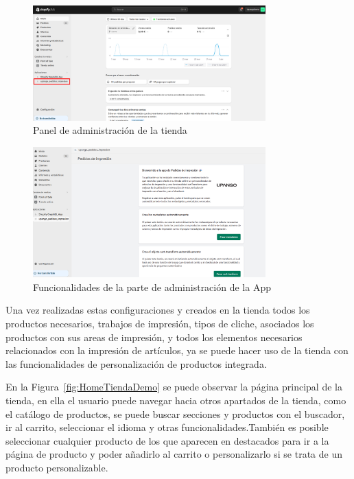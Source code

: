 \documentclass[11pt]{article}
\begin{document}
\begin{figure}[H]
    \centering
    \includegraphics[width=0.8\textwidth]{imagenes/ManualUsuario/PaginaAdministracion.png}
    \caption{\label{fig:PanelAdministracion}Panel de administración de la tienda}
    \vspace{\fill}
\end{figure}

\begin{figure}[H]
    \centering
    \includegraphics[width=0.8\textwidth]{imagenes/ManualUsuario/FuncionalidadPaginaAdministracion.png}
    \caption{\label{fig:FuncionalidadAdministracion}Funcionalidades de la parte de administración de la App}
    \vspace{\fill}
\end{figure}

Una vez realizadas estas configuraciones y creados en la tienda todos los productos necesarios, trabajos de impresión, tipos de cliche, asociados los productos con sus areas de impresión, y todos los elementos necesarios relacionados con
la impresión de artículos, ya se puede hacer uso de la tienda con las funcionalidades de personalización de productos integrada.

En la Figura~\ref{fig:HomeTiendaDemo} se puede observar la página principal de la tienda, en ella el usuario puede navegar hacia otros apartados de la tienda, como el catálogo de productos, se puede buscar secciones y productos con el buscador, ir al carrito, seleccionar el idioma y otras funcionalidades.También
es posible seleccionar cualquier producto de los que aparecen en destacados para ir a la página de producto y poder añadirlo al carrito o personalizarlo si se trata de un producto
personalizable.
\end{document}
